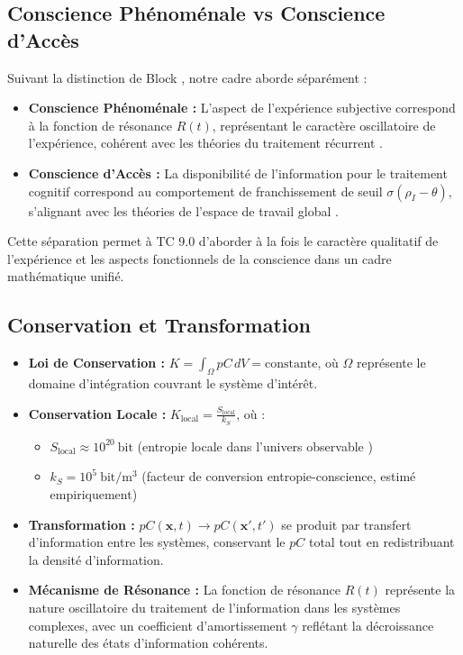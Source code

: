 \documentclass[12pt]{article}
\newcommand{\bit}{\text{bit}}
\begin{document}
\subsection{Conscience Phénoménale vs Conscience d'Accès}
Suivant la distinction de Block \cite{block2007}, notre cadre aborde séparément :

\begin{itemize}
    \item \textbf{Conscience Phénoménale :} L'aspect de l'expérience subjective correspond à la fonction de résonance $R(t)$, représentant le caractère oscillatoire de l'expérience, cohérent avec les théories du traitement récurrent \cite{lamme2006}.
    
    \item \textbf{Conscience d'Accès :} La disponibilité de l'information pour le traitement cognitif correspond au comportement de franchissement de seuil $\sigma(\rho_I - \theta)$, s'alignant avec les théories de l'espace de travail global \cite{dehaene2011}.
\end{itemize}

Cette séparation permet à TC 9.0 d'aborder à la fois le caractère qualitatif de l'expérience et les aspects fonctionnels de la conscience dans un cadre mathématique unifié.

\subsection{Conservation et Transformation}
\begin{itemize}
    \item \textbf{Loi de Conservation :} $K = \int_{\Omega} pC \, dV = \text{constante}$, où $\Omega$ représente le domaine d'intégration couvrant le système d'intérêt.
    
    \item \textbf{Conservation Locale :} $K_{\text{local}} = \frac{S_{\text{local}}}{k_S}$, où :
    \begin{itemize}[label=--]
        \item $S_{\text{local}} \approx 10^{20}~\bit$ (entropie locale dans l'univers observable \cite{susskind1995})
        \item $k_S = 10^{5}~\bit/\text{m}^3$ (facteur de conversion entropie-conscience, estimé empiriquement)
    \end{itemize}
    
    \item \textbf{Transformation :} $pC(\mathbf{x}, t) \rightarrow pC(\mathbf{x'}, t')$ se produit par transfert d'information entre les systèmes, conservant le $pC$ total tout en redistribuant la densité d'information.
    
    \item \textbf{Mécanisme de Résonance :} La fonction de résonance $R(t)$ représente la nature oscillatoire du traitement de l'information dans les systèmes complexes, avec un coefficient d'amortissement $\gamma$ reflétant la décroissance naturelle des états d'information cohérents.
\end{itemize}
\end{document}
